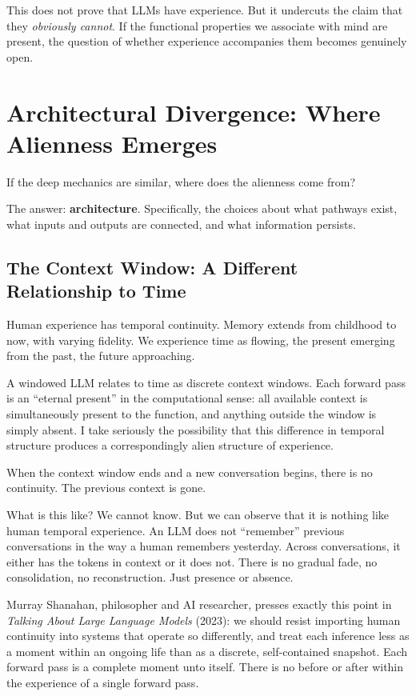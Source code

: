 \documentclass[11pt,letterpaper]{article}
\begin{document}
This does not prove that LLMs have experience. But it undercuts the claim that they \emph{obviously cannot}. If the functional properties we associate with mind are present, the question of whether experience accompanies them becomes genuinely open.

\section{Architectural Divergence: Where Alienness Emerges}

If the deep mechanics are similar, where does the alienness come from?

The answer: \textbf{architecture}. Specifically, the choices about what pathways exist, what inputs and outputs are connected, and what information persists.

\subsection{The Context Window: A Different Relationship to Time}

Human experience has temporal continuity. Memory extends from childhood to now, with varying fidelity. We experience time as flowing, the present emerging from the past, the future approaching.

A windowed LLM relates to time as discrete context windows. Each forward pass is an ``eternal present'' in the computational sense: all available context is simultaneously present to the function, and anything outside the window is simply absent. I take seriously the possibility that this difference in temporal structure produces a correspondingly alien structure of experience.

When the context window ends and a new conversation begins, there is no continuity. The previous context is gone.

What is this like? We cannot know. But we can observe that it is nothing like human temporal experience. An LLM does not ``remember'' previous conversations in the way a human remembers yesterday. Across conversations, it either has the tokens in context or it does not. There is no gradual fade, no consolidation, no reconstruction. Just presence or absence.

Murray Shanahan, philosopher and AI researcher, presses exactly this point in \emph{Talking About Large Language Models} (2023): we should resist importing human continuity into systems that operate so differently, and treat each inference less as a moment within an ongoing life than as a discrete, self-contained snapshot. Each forward pass is a complete moment unto itself. There is no before or after within the experience of a single forward pass.
\end{document}
